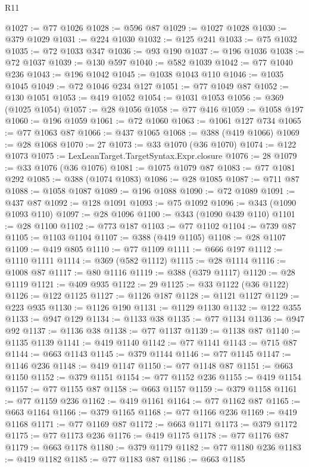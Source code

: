 \begin{lexlean}{R11}
\begin{coremodule}
@1027 := @77 @1026
@1028 := @596 @87
@1029 := @1027 @1028
@1030 := @379 @1029
@1031 := @224 @1030
@1032 := @125 @241
@1033 := @75 @1032
@1035 := @72 @1033 @347
@1036 := @93 @190
@1037 := @196 @1036
@1038 := @72 @1037
@1039 := @130 @597
@1040 := @582 @1039
@1042 := @77 @1040 @236
@1043 := @196 @1042
@1045 := @1038 @1043 @110
@1046 := @1035 @1045
@1049 := @72 @1046 @234 @127
@1051 := @77 @1049 @87
@1052 := @130 @1051
@1053 := @419 @1052
@1054 := @1031 @1053
@1056 := @369 (@1025 @1054)
@1057 := @28 @1056
@1058 := @77 @416
@1059 := @1058 @197
@1060 := @196 @1059
@1061 := @72 @1060
@1063 := @1061 @127 @734
@1065 := @77 @1063 @87
@1066 := @437 @1065
@1068 := @388 (@419 @1066)
@1069 := @28 @1068
@1070 := 27
@1073 := @33 @1070 (@36 @1070)
@1074 := @122 @1073
@1075 := LexLeanTarget.TargetSyntax.Expr.closure
@1076 := 28
@1079 := @33 @1076 (@36 @1076)
@1081 := @1075 @1079 @87
@1083 := @77 @1081 @292
@1085 := @388 (@1074 @1083)
@1086 := @28 @1085
@1087 := @711 @87
@1088 := @1058 @1087
@1089 := @196 @1088
@1090 := @72 @1089
@1091 := @437 @87
@1092 := @128 @1091
@1093 := @75 @1092
@1096 := @343 (@1090 @1093 @110)
@1097 := @28 @1096
@1100 := @343 (@1090 @439 @110)
@1101 := @28 @1100
@1102 := @773 @187
@1103 := @77 @1102
@1104 := @739 @87
@1105 := @1103 @1104
@1107 := @388 (@419 @1105)
@1108 := @28 @1107
@1109 := @419 @805
@1110 := @77 @1109
@1111 := @666 @197
@1112 := @1110 @1111
@1114 := @369 (@582 @1112)
@1115 := @28 @1114
@1116 := @1008 @87
@1117 := @80 @1116
@1119 := @388 (@379 @1117)
@1120 := @28 @1119
@1121 := @409 @935
@1122 := 29
@1125 := @33 @1122 (@36 @1122)
@1126 := @122 @1125
@1127 := @1126 @187
@1128 := @1121 @1127
@1129 := @223 @935
@1130 := @1126 @190
@1131 := @1129 @1130
@1132 := @122 @355
@1133 := @947 @129
@1134 := @1133 @38
@1135 := @77 @1134
@1136 := @947 @92
@1137 := @1136 @38
@1138 := @77 @1137
@1139 := @1138 @87
@1140 := @1135 @1139
@1141 := @419 @1140
@1142 := @77 @1141
@1143 := @715 @87
@1144 := @663 @1143
@1145 := @379 @1144
@1146 := @77 @1145
@1147 := @1146 @236
@1148 := @419 @1147
@1150 := @77 @1148 @87
@1151 := @663 @1150
@1152 := @379 @1151
@1154 := @77 @1152 @236
@1155 := @419 @1154
@1157 := @77 @1155 @87
@1158 := @663 @1157
@1159 := @379 @1158
@1161 := @77 @1159 @236
@1162 := @419 @1161
@1164 := @77 @1162 @87
@1165 := @663 @1164
@1166 := @379 @1165
@1168 := @77 @1166 @236
@1169 := @419 @1168
@1171 := @77 @1169 @87
@1172 := @663 @1171
@1173 := @379 @1172
@1175 := @77 @1173 @236
@1176 := @419 @1175
@1178 := @77 @1176 @87
@1179 := @663 @1178
@1180 := @379 @1179
@1182 := @77 @1180 @236
@1183 := @419 @1182
@1185 := @77 @1183 @87
@1186 := @663 @1185

\end{coremodule}
\end{lexlean}
